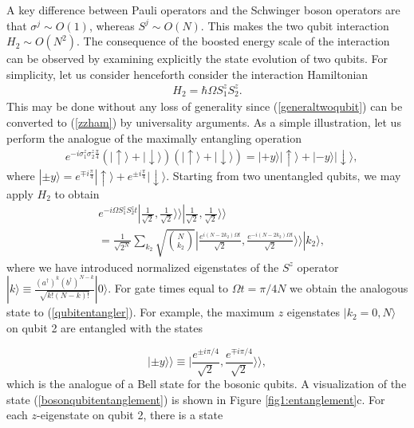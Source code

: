 \documentclass[
aps,%
12pt,%
final,%
notitlepage,%
oneside,%
onecolumn,%
nobibnotes,%
nofootinbib,%
superscriptaddress,%
noshowpacs,%
centertags]%
{revtex4}
\begin{document}
A key difference between Pauli operators and the Schwinger boson operators are that $ \sigma^j \sim O(1) $, whereas $ S^j \sim O(N) $.  This makes the two qubit interaction $ H_2 \sim O(N^2) $.  The consequence of the boosted energy scale of the interaction can be observed by examining explicitly the state evolution of two qubits. For simplicity, let us consider henceforth consider the interaction Hamiltonian
%
\begin{align}
\label{zzham}
H_2 = \hbar \Omega S^z_1 S^z_2 .
\end{align}
%
This may be done without any loss of generality since (\ref{generaltwoqubit}) can be converted to (\ref{zzham}) by universality arguments.
As a simple illustration, let us perform the analogue of the maximally entangling operation
%
\begin{align}
& e^{-i  \sigma^z_1 \sigma^z_2 \frac{\pi}{4} } ( | \uparrow \rangle + | \downarrow \rangle ) ( | \uparrow \rangle + | \downarrow \rangle ) =  | + y \rangle | \uparrow \rangle  + | - y \rangle | \downarrow \rangle, \label{qubitentangler}
\end{align}
%
where $ | \pm y \rangle = e^{\mp i\frac{\pi}{4}} | \uparrow \rangle + e^{\pm i\frac{\pi}{4}} | \downarrow \rangle $. Starting from two unentangled qubits, we may apply $ H_2 $ to obtain
%
\begin{align}
& e^{-i \Omega S^z_1 S^z_2 t} | \frac{1}{\sqrt{2}}, \frac{1}{\sqrt{2}} \rangle \rangle | \frac{1}{\sqrt{2}}, \frac{1}{\sqrt{2}} \rangle \rangle \nonumber \\
& = \frac{1}{\sqrt{2^N}} \sum_{k_2} \sqrt{\binom{N}{k_2}}  | \frac{e^{i(N-2 k_2)\Omega t}}{\sqrt{2}}  , \frac{e^{-i(N-2 k_2) \Omega t}}{\sqrt{2}}  \rangle \rangle |k_2 \rangle ,
\label{bosonqubitentanglement}
\end{align}
%
where we have introduced normalized eigenstates of the $ S^z $ operator $ |k \rangle \equiv \frac{(a^\dagger)^k (b^\dagger)^{N-k}}{\sqrt{k!(N-k)!}} |0 \rangle $.  For gate times equal to $ \Omega t = \pi/4N   $ we obtain the analogous state to (\ref{qubitentangler}). For example, the maximum $z$ eigenstates $ |k_2=0,N \rangle $ on qubit 2 are entangled with the states

\begin{equation}
| \pm y \rangle \rangle \equiv | \frac{e^{\pm i\pi/4}}{\sqrt{2}}  , \frac{e^{\mp i \pi/4}}{\sqrt{2}} \rangle \rangle  ,
\end{equation}
which is the analogue of a Bell state for the bosonic qubits. A visualization of the state (\ref{bosonqubitentanglement}) is shown in Figure \ref{fig1:entanglement}c. For each $z$-eigenstate on qubit 2, there is a state
\end{document}
